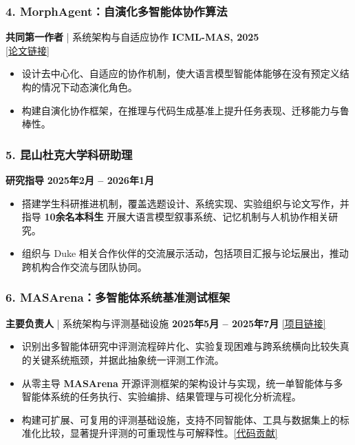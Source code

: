 \documentclass[10pt,a4paper]{article}
\begin{document}
    \subsubsection*{4. \color{itemcolor}MorphAgent：自演化多智能体协作算法}
    \noindent\textbf{\color{sectioncolor}共同第一作者} | 系统架构与自适应协作 \hfill \color{accentcolor}\textbf{ICML-MAS, 2025} \\
    \noindent\href{https://arxiv.org/abs/2410.15048}{\color{linkcolor}[论文链接]} \\
    \begin{itemize}[leftmargin=*, label=\textcolor{accentcolor}{\textbullet}, itemsep=0.2em]
        \item 设计去中心化、自适应的协作机制，使大语言模型智能体能够在没有预定义结构的情况下动态演化角色。
        \item 构建自演化协作框架，在推理与代码生成基准上提升任务表现、迁移能力与鲁棒性。
    \end{itemize}
    \subsubsection*{5. \color{itemcolor}昆山杜克大学科研助理}
    \noindent\textbf{\color{sectioncolor}研究指导}  \hfill \color{accentcolor}\textbf{2025年2月 – 2026年1月}
    \begin{itemize}[leftmargin=*, label=\textcolor{accentcolor}{\textbullet}, itemsep=0.2em]
        \item 搭建学生科研推进机制，覆盖选题设计、系统实现、实验组织与论文写作，并指导 \textbf{10余名本科生} 开展大语言模型叙事系统、记忆机制与人机协作相关研究。
        \item 组织与 Duke 相关合作伙伴的交流展示活动，包括项目汇报与论坛展出，推动跨机构合作交流与团队协同。
    \end{itemize}
    \subsubsection*{6. \color{itemcolor}MASArena：多智能体系统基准测试框架}
    \noindent\textbf{\color{sectioncolor}主要负责人} | 系统架构与评测基础设施 \hfill \color{accentcolor}\textbf{2025年5月 – 2025年7月}
    \noindent\href{https://github.com/LINs-lab/MASArena}{\color{linkcolor}[项目链接]} \\
    \begin{itemize}[leftmargin=*, label=\textcolor{accentcolor}{\textbullet}, itemsep=0.2em]
        \item 识别出多智能体研究中评测流程碎片化、实验复现困难与跨系统横向比较失真的关键系统瓶颈，并据此抽象统一评测工作流。
        \item 从零主导 \textbf{MASArena} 开源评测框架的架构设计与实现，统一单智能体与多智能体系统的任务执行、实验编排、结果管理与可视化分析流程。
        \item 构建可扩展、可复用的评测基础设施，支持不同智能体、工具与数据集上的标准化比较，显著提升评测的可重现性与可解释性。\href{https://github.com/LINs-lab/MASArena/graphs/contributors}{\color{linkcolor}[代码贡献]}
    \end{itemize}
\end{document}
